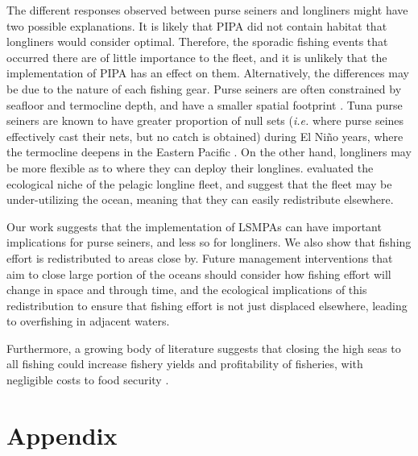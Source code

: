 \documentclass[11pt,]{article}
\begin{document}
The different responses observed between purse seiners and longliners
might have two possible explanations. It is likely that PIPA did not
contain habitat that longliners would consider optimal. Therefore, the
sporadic fishing events that occurred there are of little importance to
the fleet, and it is unlikely that the implementation of PIPA has an
effect on them. Alternatively, the differences may be due to the nature
of each fishing gear. Purse seiners are often constrained by seafloor
and termocline depth, and have a smaller spatial footprint
\citep{kroodsma_2018}. Tuna purse seiners are known to have greater
proportion of null sets (\emph{i.e.} where purse seines effectively cast
their nets, but no catch is obtained) during El Niño years, where the
termocline deepens in the Eastern Pacific \citep{dreyfusleon_2015}. On
the other hand, longliners may be more flexible as to where they can
deploy their longlines. \citet{ortuocrespo_2018} evaluated the
ecological niche of the pelagic longline fleet, and suggest that the
fleet may be under-utilizing the ocean, meaning that they can easily
redistribute elsewhere.

Our work suggests that the implementation of LSMPAs can have important
implications for purse seiners, and less so for longliners. We also show
that fishing effort is redistributed to areas close by. Future
management interventions that aim to close large portion of the oceans
should consider how fishing effort will change in space and through
time, and the ecological implications of this redistribution to ensure
that fishing effort is not just displaced elsewhere, leading to
overfishing in adjacent waters.

Furthermore, a growing body of literature suggests that closing the high
seas to all fishing could increase fishery yields and profitability of
fisheries, with negligible costs to food security
\citep{white_2014,sumaila_2015,sala_2018a,schiller_2018}.

\clearpage

\hypertarget{refs}{}

\clearpage

\hypertarget{appendix}{%
\section{Appendix}\label{appendix}}

\setcounter{table}{0}  \renewcommand{\thetable}{S\arabic{table}} \setcounter{figure}{0} \renewcommand{\thefigure}{S\arabic{figure}}
\end{document}
